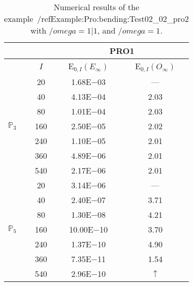 \begin{table}[H]
\caption{Numerical results of the example~/ref{Example:Pro:bending:Test02_02_pro2} with $/omega=1|1$, and $/omega=1$.}
\setlength{\tabcolsep}{5pt}
\centering
\begin{tabular}{@{}l c c c@{}}
\toprule
 &  & \multicolumn{2}{c}{PRO1}\\
\midrule
 & $I$ & E$_{0,I}(E_{\infty})$ & E$_{0,I}(O_{\infty})$\\
\midrule
\multirow{7}{*}{$\mathbb{P}_{3}$}
 & 20 & 1.68E$-$03 & ---\\
 & 40 & 4.13E$-$04 & 2.03\\
 & 80 & 1.01E$-$04 & 2.03\\
 & 160 & 2.50E$-$05 & 2.02\\
 & 240 & 1.10E$-$05 & 2.01\\
 & 360 & 4.89E$-$06 & 2.01\\
 & 540 & 2.17E$-$06 & 2.01\\
\midrule
\multirow{7}{*}{$\mathbb{P}_{5}$}
 & 20 & 3.14E$-$06 & ---\\
 & 40 & 2.40E$-$07 & 3.71\\
 & 80 & 1.30E$-$08 & 4.21\\
 & 160 & 10.00E$-$10 & 3.70\\
 & 240 & 1.37E$-$10 & 4.90\\
 & 360 & 7.35E$-$11 & 1.54\\
 & 540 & 2.96E$-$10 & $\uparrow$\\
\bottomrule
\end{tabular}
\label{Table:PRO:test_02_02_test5_pro2}
\end{table}
